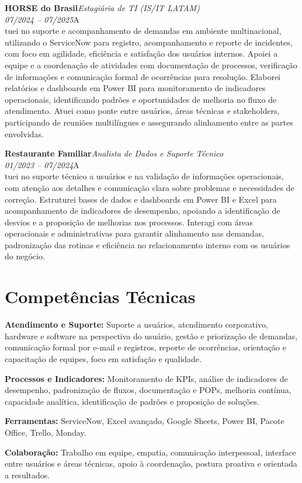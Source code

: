 \documentclass[11pt,a4paper]{article}
\newcommand{\cvrole}[4]{%
  \vspace{4pt}%
  {\bfseries\color{accentcolor}#1}\hfill{\itshape #2}\\[-2pt]%
  {\itshape #3}\hfill #4\\[6pt]%
}
\begin{document}
\cvrole{HORSE do Brasil}{Estagiária de TI (IS/IT LATAM)}{07/2024 -- 07/2025}

Atuei no suporte e acompanhamento de demandas em ambiente multinacional, utilizando o ServiceNow para registro, acompanhamento e reporte de incidentes, com foco em agilidade, eficiência e satisfação dos usuários internos. Apoiei a equipe e a coordenação de atividades com documentação de processos, verificação de informações e comunicação formal de ocorrências para resolução. Elaborei relatórios e dashboards em Power BI para monitoramento de indicadores operacionais, identificando padrões e oportunidades de melhoria no fluxo de atendimento. Atuei como ponte entre usuários, áreas técnicas e stakeholders, participando de reuniões multilíngues e assegurando alinhamento entre as partes envolvidas.

\cvrole{Restaurante Familiar}{Analista de Dados e Suporte Técnico}{01/2023 -- 07/2024}

Atuei no suporte técnico a usuários e na validação de informações operacionais, com atenção aos detalhes e comunicação clara sobre problemas e necessidades de correção. Estruturei bases de dados e dashboards em Power BI e Excel para acompanhamento de indicadores de desempenho, apoiando a identificação de desvios e a proposição de melhorias nos processos. Interagi com áreas operacionais e administrativas para garantir alinhamento nas demandas, padronização das rotinas e eficiência no relacionamento interno com os usuários do negócio.

\section{Competências Técnicas}

\textbf{Atendimento e Suporte:} Suporte a usuários, atendimento corporativo, hardware e software na perspectiva do usuário, gestão e priorização de demandas, comunicação formal por e-mail e registros, reporte de ocorrências, orientação e capacitação de equipes, foco em satisfação e qualidade.

\textbf{Processos e Indicadores:} Monitoramento de KPIs, análise de indicadores de desempenho, padronização de fluxos, documentação e POPs, melhoria contínua, capacidade analítica, identificação de padrões e proposição de soluções.

\textbf{Ferramentas:} ServiceNow, Excel avançado, Google Sheets, Power BI, Pacote Office, Trello, Monday.

\textbf{Colaboração:} Trabalho em equipe, empatia, comunicação interpessoal, interface entre usuários e áreas técnicas, apoio à coordenação, postura proativa e orientada a resultados.
\end{document}
